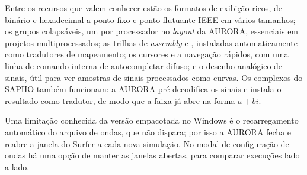 Entre os recursos que valem conhecer estão os formatos de exibição ricos, de binário e hexadecimal a ponto fixo e ponto flutuante IEEE em vários tamanhos; os grupos colapsáveis, um por processador no \textit{layout} da AURORA, essenciais em projetos multiprocessados; as trilhas de \textit{assembly} e \cmm{}, instaladas automaticamente como tradutores de mapeamento; os cursores e a navegação rápidos, com uma linha de comando interna de autocompletar difuso; e o desenho analógico de sinais, útil para ver amostras de sinais processados como curvas. Os complexos do SAPHO também funcionam: a AURORA pré-decodifica os sinais  e instala o resultado como tradutor, de modo que a faixa já abre na forma $a+bi$.

Uma limitação conhecida da versão empacotada no Windows é o recarregamento automático do arquivo de ondas, que não dispara; por isso a AURORA fecha e reabre a janela do Surfer a cada nova simulação. No modal de configuração de ondas há uma opção de manter as janelas abertas, para comparar execuções lado a lado.
